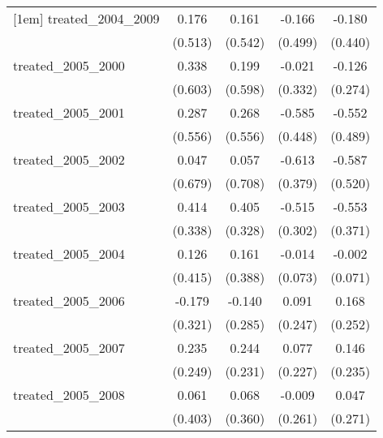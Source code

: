 {\begin{tabular}{l*{4}{c}}
[1em]
treated\_2004\_2009&       0.176         &       0.161         &      -0.166         &      -0.180         \\
            &     (0.513)         &     (0.542)         &     (0.499)         &     (0.440)         \\
[1em]
treated\_2005\_2000&       0.338         &       0.199         &      -0.021         &      -0.126         \\
            &     (0.603)         &     (0.598)         &     (0.332)         &     (0.274)         \\
[1em]
treated\_2005\_2001&       0.287         &       0.268         &      -0.585         &      -0.552         \\
            &     (0.556)         &     (0.556)         &     (0.448)         &     (0.489)         \\
[1em]
treated\_2005\_2002&       0.047         &       0.057         &      -0.613         &      -0.587         \\
            &     (0.679)         &     (0.708)         &     (0.379)         &     (0.520)         \\
[1em]
treated\_2005\_2003&       0.414         &       0.405         &      -0.515         &      -0.553         \\
            &     (0.338)         &     (0.328)         &     (0.302)         &     (0.371)         \\
[1em]
treated\_2005\_2004&       0.126         &       0.161         &      -0.014         &      -0.002         \\
            &     (0.415)         &     (0.388)         &     (0.073)         &     (0.071)         \\
[1em]
treated\_2005\_2006&      -0.179         &      -0.140         &       0.091         &       0.168         \\
            &     (0.321)         &     (0.285)         &     (0.247)         &     (0.252)         \\
[1em]
treated\_2005\_2007&       0.235         &       0.244         &       0.077         &       0.146         \\
            &     (0.249)         &     (0.231)         &     (0.227)         &     (0.235)         \\
[1em]
treated\_2005\_2008&       0.061         &       0.068         &      -0.009         &       0.047         \\
            &     (0.403)         &     (0.360)         &     (0.261)         &     (0.271)         \\

\end{tabular}}
